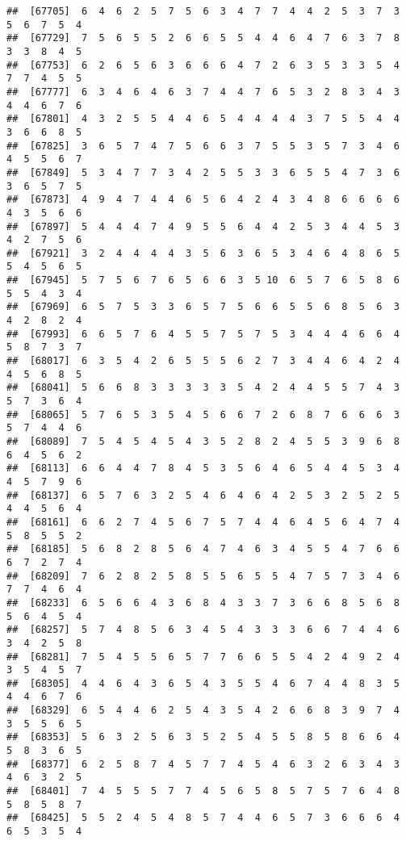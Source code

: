 \documentclass[
]{book}
\begin{document}
\begin{verbatim}
##  [67705]  6  4  6  2  5  7  5  6  3  4  7  7  4  4  2  5  3  7  3  5  6  7  5  4
##  [67729]  7  5  6  5  5  2  6  6  5  5  4  4  6  4  7  6  3  7  8  3  3  8  4  5
##  [67753]  6  2  6  5  6  3  6  6  6  4  7  2  6  3  5  3  3  5  4  7  7  4  5  5
##  [67777]  6  3  4  6  4  6  3  7  4  4  7  6  5  3  2  8  3  4  3  4  4  6  7  6
##  [67801]  4  3  2  5  5  4  4  6  5  4  4  4  4  3  7  5  5  4  4  3  6  6  8  5
##  [67825]  3  6  5  7  4  7  5  6  6  3  7  5  5  3  5  7  3  4  6  4  5  5  6  7
##  [67849]  5  3  4  7  7  3  4  2  5  5  3  3  6  5  5  4  7  3  6  3  6  5  7  5
##  [67873]  4  9  4  7  4  4  6  5  6  4  2  4  3  4  8  6  6  6  6  4  3  5  6  6
##  [67897]  5  4  4  4  7  4  9  5  5  6  4  4  2  5  3  4  4  5  3  4  2  7  5  6
##  [67921]  3  2  4  4  4  4  3  5  6  3  6  5  3  4  6  4  8  6  5  5  4  5  6  5
##  [67945]  5  7  5  6  7  6  5  6  6  3  5 10  6  5  7  6  5  8  6  5  5  4  3  4
##  [67969]  6  5  7  5  3  3  6  5  7  5  6  6  5  5  6  8  5  6  3  4  2  8  2  4
##  [67993]  6  6  5  7  6  4  5  5  7  5  7  5  3  4  4  4  6  6  4  5  8  7  3  7
##  [68017]  6  3  5  4  2  6  5  5  5  6  2  7  3  4  4  6  4  2  4  4  5  6  8  5
##  [68041]  5  6  6  8  3  3  3  3  3  5  4  2  4  4  5  5  7  4  3  5  7  3  6  4
##  [68065]  5  7  6  5  3  5  4  5  6  6  7  2  6  8  7  6  6  6  3  5  7  4  4  6
##  [68089]  7  5  4  5  4  5  4  3  5  2  8  2  4  5  5  3  9  6  8  6  4  5  6  2
##  [68113]  6  6  4  4  7  8  4  5  3  5  6  4  6  5  4  4  5  3  4  4  5  7  9  6
##  [68137]  6  5  7  6  3  2  5  4  6  4  6  4  2  5  3  2  5  2  5  4  4  5  6  4
##  [68161]  6  6  2  7  4  5  6  7  5  7  4  4  6  4  5  6  4  7  4  5  8  5  5  2
##  [68185]  5  6  8  2  8  5  6  4  7  4  6  3  4  5  5  4  7  6  6  6  7  2  7  4
##  [68209]  7  6  2  8  2  5  8  5  5  6  5  5  4  7  5  7  3  4  6  7  7  4  6  4
##  [68233]  6  5  6  6  4  3  6  8  4  3  3  7  3  6  6  8  5  6  8  5  6  4  5  4
##  [68257]  5  7  4  8  5  6  3  4  5  4  3  3  3  6  6  7  4  4  6  3  4  2  5  8
##  [68281]  7  5  4  5  5  6  5  7  7  6  6  5  5  4  2  4  9  2  4  3  5  4  5  7
##  [68305]  4  4  6  4  3  6  5  4  3  5  5  4  6  7  4  4  8  3  5  4  4  6  7  6
##  [68329]  6  5  4  4  6  2  5  4  3  5  4  2  6  6  8  3  9  7  4  3  5  5  6  5
##  [68353]  5  6  3  2  5  6  3  5  2  5  4  5  5  8  5  8  6  6  4  5  8  3  6  5
##  [68377]  6  2  5  8  7  4  5  7  7  4  5  4  6  3  2  6  3  4  3  4  6  3  2  5
##  [68401]  7  4  5  5  5  7  7  4  5  6  5  8  5  7  5  7  6  4  8  5  8  5  8  7
##  [68425]  5  5  2  4  5  4  8  5  7  4  4  6  5  7  3  6  6  6  4  6  5  3  5  4

\end{verbatim}
\end{document}
